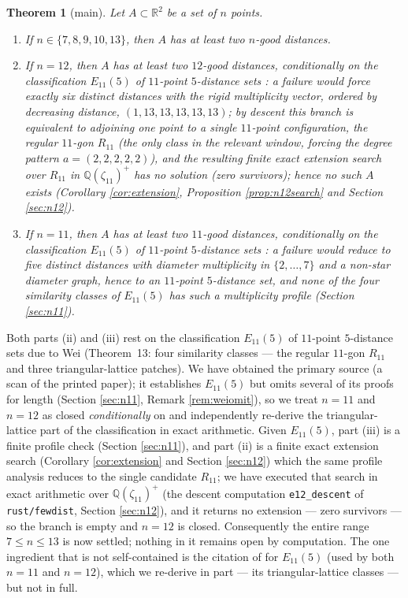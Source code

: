 \documentclass[11pt]{article}
\newtheorem{theorem}{Theorem}[section]
\theoremstyle{definition}
\theoremstyle{remark}
\newcommand{\R}{\mathbb{R}}
\newcommand{\Q}{\mathbb{Q}}
\begin{document}
\begin{theorem}[main]\label{thm:main}
Let $A \subset \R^2$ be a set of $n$ points.
\begin{enumerate}
\item[(i)] If $n \in \{7, 8, 9, 10, 13\}$, then $A$ has at least two $n$-good distances.
\item[(ii)] If $n = 12$, then $A$ has at least two $12$-good distances, conditionally on
the classification $E_{11}(5)$ of $11$-point $5$-distance sets \cite[Theorem~13]{Wei11}: a
failure would force exactly six distinct distances with the rigid multiplicity vector,
ordered by decreasing distance, $(1, 13, 13, 13, 13, 13)$; by descent this branch is
equivalent to adjoining one point to a single $11$-point configuration, the regular
$11$-gon $R_{11}$ (the only class in the relevant window, forcing the degree pattern
$a = (2,2,2,2,2)$), and the resulting finite exact extension search over $R_{11}$ in
$\Q(\zeta_{11})^+$ has no solution (zero survivors); hence no such $A$ exists (Corollary
\ref{cor:extension}, Proposition \ref{prop:n12search} and Section \ref{sec:n12}).
\item[(iii)] If $n = 11$, then $A$ has at least two $11$-good distances, conditionally on
the classification $E_{11}(5)$ of $11$-point $5$-distance sets \cite[Theorem~13]{Wei11}:
a failure would reduce to five distinct distances with diameter multiplicity in
$\{2, \dots, 7\}$ and a non-star diameter graph, hence to an $11$-point $5$-distance set,
and none of the four similarity classes of $E_{11}(5)$ has such a multiplicity profile
(Section \ref{sec:n11}).
\end{enumerate}
\end{theorem}

Both parts (ii) and (iii) rest on the classification $E_{11}(5)$ of $11$-point
$5$-distance sets due to Wei \cite{Wei11} (Theorem~13: four similarity classes ---
the regular $11$-gon $R_{11}$ and three triangular-lattice patches). We have obtained the
primary source (a scan of the printed paper); it establishes $E_{11}(5)$ but omits several
of its proofs for length (Section \ref{sec:n11}, Remark \ref{rem:weiomit}), so we treat
$n = 11$ and $n = 12$ as closed \emph{conditionally} on \cite{Wei11} and independently
re-derive the triangular-lattice part of the classification in exact arithmetic. Given
$E_{11}(5)$, part (iii) is a finite profile check (Section \ref{sec:n11}), and part (ii)
is a finite exact extension search (Corollary \ref{cor:extension} and Section
\ref{sec:n12}) which the same profile analysis reduces to the single candidate $R_{11}$;
we have executed that search in exact arithmetic over $\Q(\zeta_{11})^+$ (the descent
computation \texttt{e12\_descent} of \texttt{rust/fewdist}, Section \ref{sec:n12}), and it
returns no extension --- zero survivors --- so the branch is empty and $n = 12$ is closed.
Consequently the entire range $7 \le n \le 13$ is now settled; nothing in it remains open
by computation. The one ingredient that is not self-contained is the citation of
\cite{Wei11} for $E_{11}(5)$ (used by both $n = 11$ and $n = 12$), which we re-derive in
part --- its triangular-lattice classes --- but not in full.
\end{document}
